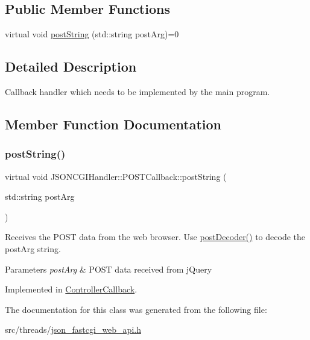 \subsection*{Public Member Functions}
\begin{DoxyCompactItemize}
\item 
virtual void \hyperlink{classJSONCGIHandler_1_1POSTCallback_a6cddb384a3fd9242b323cea3d82a6bb7}{post\+String} (std\+::string post\+Arg)=0
\end{DoxyCompactItemize}


\subsection{Detailed Description}
Callback handler which needs to be implemented by the main program. 

\subsection{Member Function Documentation}
\mbox{\label{classJSONCGIHandler_1_1POSTCallback_a6cddb384a3fd9242b323cea3d82a6bb7}} 
\subsubsection{\texorpdfstring{post\+String()}{postString()}}
{\footnotesize\ttfamily virtual void J\+S\+O\+N\+C\+G\+I\+Handler\+::\+P\+O\+S\+T\+Callback\+::post\+String (\begin{DoxyParamCaption}\item[{std\+::string}]{post\+Arg }\end{DoxyParamCaption})\hspace{0.3cm}{\ttfamily [pure virtual]}}

Receives the P\+O\+ST data from the web browser. Use \hyperlink{classJSONCGIHandler_a0f208af3dd050ed182967fe9cca42d78}{post\+Decoder()} to decode the post\+Arg string. 
\begin{DoxyParams}{Parameters}
{\em post\+Arg} & P\+O\+ST data received from j\+Query \\
\hline
\end{DoxyParams}


Implemented in \hyperlink{classControllerCallback_aa7aa4c4c12ced1395e8c40ed1b82db12}{Controller\+Callback}.



The documentation for this class was generated from the following file\+:\begin{DoxyCompactItemize}
\item 
src/threads/\hyperlink{json__fastcgi__web__api_8h}{json\+\_\+fastcgi\+\_\+web\+\_\+api.\+h}\end{DoxyCompactItemize}
